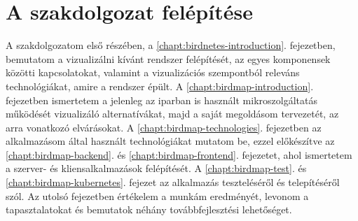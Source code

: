 \section{A szakdolgozat felépítése}
A szakdolgozatom első részében, a \ref{chapt:birdnetes-introduction}. fejezetben, bemutatom a vizualizálni kívánt rendszer felépítését, az egyes komponensek közötti kapcsolatokat,
valamint a vizualizációs szempontból releváns technológiákat, amire a rendszer épült.
A \ref{chapt:birdmap-introduction}. fejezetben ismertetem a jelenleg az iparban is használt mikroszolgáltatás működését vizualizáló alternatívákat, majd a saját megoldásom tervezetét, az arra vonatkozó elvárásokat.
A \ref{chapt:birdmap-technologies}. fejezetben az alkalmazásom által használt technológiákat mutatom be, 
ezzel előkészítve az \ref{chapt:birdmap-backend}. és \ref{chapt:birdmap-frontend}. fejezetet, ahol ismertetem a szerver- és kliensalkalmazások felépítését.
A \ref{chapt:birdmap-test}. és \ref{chapt:birdmap-kubernetes}. fejezet az alkalmazás teszteléséről és telepítéséről szól.
Az utolsó fejezetben értékelem a munkám eredményét, levonom a tapasztalatokat és bemutatok néhány továbbfejlesztési lehetőséget.